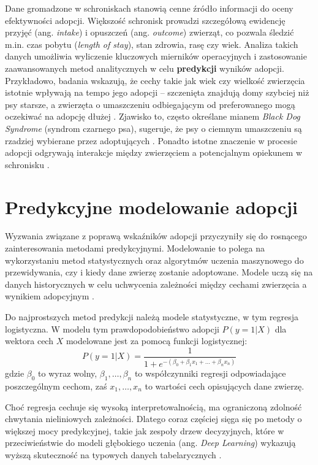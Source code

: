 Dane gromadzone w schroniskach stanowią cenne źródło informacji do oceny efektywności adopcji. Większość schronisk prowadzi szczegółową ewidencję przyjęć (ang. \emph{intake}) i opuszczeń (ang. \emph{outcome}) zwierząt, co pozwala śledzić m.in. czas pobytu (\emph{length of stay}), stan zdrowia, rasę czy wiek. Analiza takich danych umożliwia wyliczenie kluczowych mierników operacyjnych i zastosowanie zaawansowanych metod analitycznych w celu \textbf{predykcji} wyników adopcji. Przykładowo, badania wskazują, że cechy takie jak wiek czy wielkość zwierzęcia istotnie wpływają na tempo jego adopcji – szczenięta znajdują domy szybciej niż psy starsze, a zwierzęta o umaszczeniu odbiegającym od preferowanego mogą oczekiwać na adopcję dłużej \cite{Bradley2021}. Zjawisko to, często określane mianem \textit{Black Dog Syndrome} (syndrom czarnego psa), sugeruje, że psy o ciemnym umaszczeniu są rzadziej wybierane przez adoptujących \cite{Gunter2016, Cain2020, svoboda2015}. Ponadto istotne znaczenie w procesie adopcji odgrywają interakcje między zwierzęciem a potencjalnym opiekunem w schronisku \cite{Protopopova2012}.

\section{Predykcyjne modelowanie adopcji}

Wyzwania związane z poprawą wskaźników adopcji przyczyniły się do rosnącego zainteresowania metodami predykcyjnymi. Modelowanie to polega na wykorzystaniu metod statystycznych oraz algorytmów uczenia maszynowego do przewidywania, czy i kiedy dane zwierzę zostanie adoptowane. Modele uczą się na danych historycznych w celu uchwycenia zależności między cechami zwierzęcia a wynikiem adopcyjnym \cite{Sazara2022}.

Do najprostszych metod predykcji należą modele statystyczne, w tym regresja logistyczna. W modelu tym prawdopodobieństwo adopcji $P(y=1|X)$ dla wektora cech $X$ modelowane jest za pomocą funkcji logistycznej:
\begin{equation}
P(y=1|X) = \frac{1}{1 + e^{-(\beta_0 + \beta_1 x_1 + \dots + \beta_n x_n)}}
\end{equation}
gdzie $\beta_0$ to wyraz wolny, $\beta_1, \ldots, \beta_n$ to współczynniki regresji odpowiadające poszczególnym cechom, zaś $x_1, \ldots, x_n$ to wartości cech opisujących dane zwierzę.

Choć regresja cechuje się wysoką interpretowalnością, ma ograniczoną zdolność chwytania nieliniowych zależności. Dlatego coraz częściej sięga się po metody o większej mocy predykcyjnej, takie jak zespoły drzew decyzyjnych, które w przeciwieństwie do modeli głębokiego uczenia (ang. \textit{Deep Learning}) wykazują wyższą skuteczność na typowych danych tabelarycznych \cite{Grinsztajn2022}.

